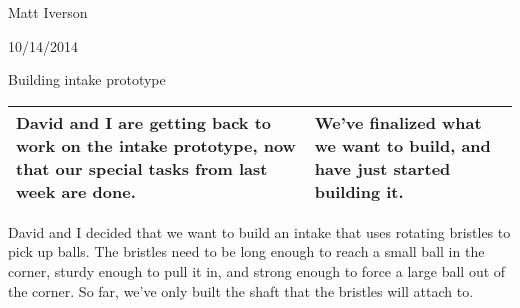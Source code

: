 Matt Iverson

10/14/2014

Building intake prototype

\begin{tabular}{|p{5cm}|p{5cm}|}
 \hline
 David and I are getting back to work on the intake prototype, now that our special tasks from last week are done. &
 We’ve finalized what we want to build, and have just started building it. \\
 \hline
\end{tabular}

David and I decided that we want to build an intake that uses rotating bristles to pick up balls. The bristles need to be long enough to reach a small ball in the corner, sturdy enough to pull it in, and strong enough to force a large ball out of the corner. So far, we’ve only built the shaft that the bristles will attach to.

